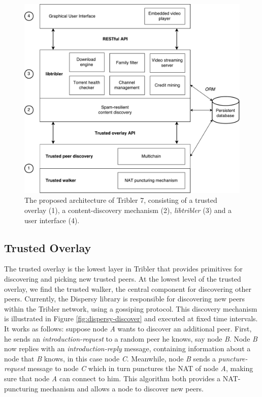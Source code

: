 \begin{figure}[h!]
	\centering
	\includegraphics[width=0.8\columnwidth]{images/architecture/tribler7}
	\caption{The proposed architecture of Tribler 7, consisting of a trusted overlay (1), a content-discovery mechanism (2), \emph{libtribler} (3) and a user interface (4).}
	\label{fig:tribler7}
\end{figure}

\subsection{Trusted Overlay}
The trusted overlay is the lowest layer in Tribler that provides primitives for discovering and picking new trusted peers. At the lowest level of the trusted overlay, we find the trusted walker, the central component for discovering other peers. Currently, the Dispersy library is responsible for discovering new peers within the Tribler network, using a gossiping protocol\cite{zeilemaker2013dispersy}. This discovery mechanism is illustrated in Figure \ref{fig:dispersy-discover} and executed at fixed time intervals. It works as follows: suppose node \emph{A} wants to discover an additional peer. First, he sends an \emph{introduction-request} to a random peer he knows, say node \emph{B}. Node \emph{B} now replies with an \emph{introduction-reply} message, containing information about a node that \emph{B} knows, in this case node \emph{C}. Meanwhile, node \emph{B} sends a \emph{puncture-request} message to node \emph{C} which in turn punctures the NAT of node \emph{A}, making sure that node \emph{A} can connect to him. This algorithm both provides a NAT-puncturing mechanism and allows a node to discover new peers.\\

